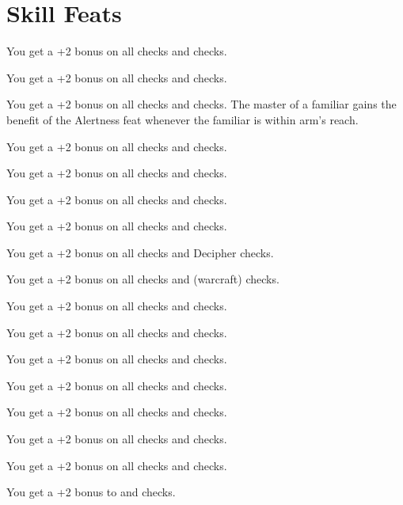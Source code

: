 \section{Skill Feats}

{You get a +2 bonus on all  checks and  checks.}

{You get a +2 bonus on all  checks and  checks.}

{You get a +2 bonus on all  checks and  checks.}
{}
{The master of a familiar gains the benefit of the Alertness feat whenever the familiar is within arm’s reach.}

{You get a +2 bonus on all  checks and  checks.}

{You get a +2 bonus on all  checks and  checks.}

{You get a +2 bonus on all  checks and  checks.}

{You get a +2 bonus on all  checks and  checks.}

{You get a +2 bonus on all  checks and Decipher  checks.}

{You get a +2 bonus on all  checks and  (warcraft) checks.}

{You get a +2 bonus on all  checks and  checks.}

{You get a +2 bonus on all  checks and  checks.}

{You get a +2 bonus on all  checks and  checks.}

{You get a +2 bonus on all  checks and  checks.}

{You get a +2 bonus on all  checks and  checks.}

{You get a +2 bonus on all  checks and  checks.}

{You get a +2 bonus on all  checks and  checks.}

{You get a +2 bonus to  and  checks.}